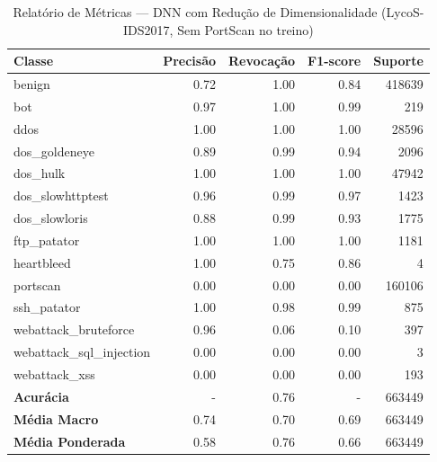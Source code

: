 \begin{table}[H]
    \centering
    \small
    \begin{tabular}{lrrrr}
        \hline
        Classe                    & Precisão & Revocação & F1-score & Suporte \\
        \hline
        benign                    & 0.72     & 1.00      & 0.84     & 418639  \\
        bot                       & 0.97     & 1.00      & 0.99     & 219     \\
        ddos                      & 1.00     & 1.00      & 1.00     & 28596   \\
        dos\_goldeneye            & 0.89     & 0.99      & 0.94     & 2096    \\
        dos\_hulk                 & 1.00     & 1.00      & 1.00     & 47942   \\
        dos\_slowhttptest         & 0.96     & 0.99      & 0.97     & 1423    \\
        dos\_slowloris            & 0.88     & 0.99      & 0.93     & 1775    \\
        ftp\_patator              & 1.00     & 1.00      & 1.00     & 1181    \\
        heartbleed                & 1.00     & 0.75      & 0.86     & 4       \\
        portscan                  & 0.00     & 0.00      & 0.00     & 160106  \\
        ssh\_patator              & 1.00     & 0.98      & 0.99     & 875     \\
        webattack\_bruteforce     & 0.96     & 0.06      & 0.10     & 397     \\
        webattack\_sql\_injection & 0.00     & 0.00      & 0.00     & 3       \\
        webattack\_xss            & 0.00     & 0.00      & 0.00     & 193     \\
        \hline
        \textbf{Acurácia}         & -        & 0.76      & -        & 663449  \\
        \textbf{Média Macro}      & 0.74     & 0.70      & 0.69     & 663449  \\
        \textbf{Média Ponderada}  & 0.58     & 0.76      & 0.66     & 663449  \\
        \hline
    \end{tabular}
    \caption{Relatório de Métricas — DNN com Redução de Dimensionalidade (LycoS-IDS2017, Sem PortScan no treino)}
    \label{table:dnn_lycos_reducao_sem_portscan_metricas}
\end{table}
